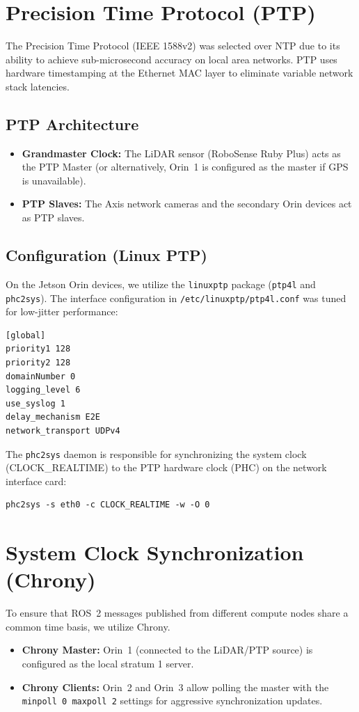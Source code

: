\documentclass[12pt,a4paper]{report}
\begin{document}
\section{Precision Time Protocol (PTP)}
The Precision Time Protocol (IEEE 1588v2) was selected over NTP due to its ability to achieve sub-microsecond accuracy on local area networks. PTP uses hardware timestamping at the Ethernet MAC layer to eliminate variable network stack latencies.

\subsection{PTP Architecture}
\begin{itemize}
    \item \textbf{Grandmaster Clock:} The LiDAR sensor (RoboSense Ruby Plus) acts as the PTP Master (or alternatively, Orin~1 is configured as the master if GPS is unavailable).
    \item \textbf{PTP Slaves:} The Axis network cameras and the secondary Orin devices act as PTP slaves.
\end{itemize}

\subsection{Configuration (Linux PTP)}
On the Jetson Orin devices, we utilize the \texttt{linuxptp} package (\texttt{ptp4l} and \texttt{phc2sys}).
The interface configuration in \texttt{/etc/linuxptp/ptp4l.conf} was tuned for low-jitter performance:
\begin{verbatim}
[global]
priority1 128
priority2 128
domainNumber 0
logging_level 6
use_syslog 1
delay_mechanism E2E
network_transport UDPv4
\end{verbatim}

The \texttt{phc2sys} daemon is responsible for synchronizing the system clock (CLOCK\_REALTIME) to the PTP hardware clock (PHC) on the network interface card:
\begin{verbatim}
phc2sys -s eth0 -c CLOCK_REALTIME -w -O 0
\end{verbatim}

\section{System Clock Synchronization (Chrony)}
To ensure that ROS~2 messages published from different compute nodes share a common time basis, we utilize Chrony.
\begin{itemize}
    \item \textbf{Chrony Master:} Orin~1 (connected to the LiDAR/PTP source) is configured as the local stratum 1 server.
    \item \textbf{Chrony Clients:} Orin~2 and Orin~3 allow polling the master with the \texttt{minpoll 0 maxpoll 2} settings for aggressive synchronization updates.
\end{itemize}
\end{document}

